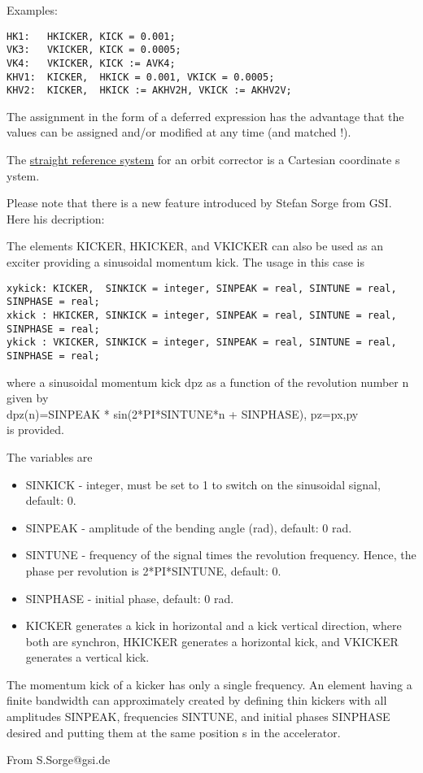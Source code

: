  Examples: 
\begin{verbatim}
HK1:   HKICKER, KICK = 0.001;
VK3:   VKICKER, KICK = 0.0005;
VK4:   VKICKER, KICK := AVK4;
KHV1:  KICKER,  HKICK = 0.001, VKICK = 0.0005;
KHV2:  KICKER,  HKICK := AKHV2H, VKICK := AKHV2V;
\end{verbatim} 

The assignment in the form of a deferred expression has the advantage
that the values can be assigned and/or modified at any time (and matched
!).  

The \href{local_system.html#straight}{straight reference system} for an
orbit corrector is a Cartesian coordinate s ystem.  

Please note that there is a new feature introduced by Stefan Sorge from
GSI. Here his decription:

The elements KICKER, HKICKER, and VKICKER can also be used as  an
exciter providing a sinusoidal momentum kick. The usage in this case is   

\begin{verbatim}
xykick: KICKER,  SINKICK = integer, SINPEAK = real, SINTUNE = real, SINPHASE = real;  
xkick : HKICKER, SINKICK = integer, SINPEAK = real, SINTUNE = real, SINPHASE = real;  
ykick : VKICKER, SINKICK = integer, SINPEAK = real, SINTUNE = real, SINPHASE = real;  
\end{verbatim}
where a sinusoidal momentum kick dpz as a function of the  revolution
number n given by\\   
dpz(n)=SINPEAK * sin(2*PI*SINTUNE*n + SINPHASE), pz=px,py \\ 
is provided. 

The variables are 

\begin{itemize}
   \item SINKICK - integer, must be set to 1 to switch on the sinusoidal
     signal, default: 0.  
   \item SINPEAK - amplitude of the bending angle (rad), default: 0 rad.  
   \item SINTUNE - frequency of the signal times the revolution
     frequency.  Hence, the phase per revolution is 2*PI*SINTUNE,
     default: 0.   
   \item SINPHASE - initial phase, default: 0 rad.  
   \item KICKER generates a kick in horizontal and a kick vertical
     direction,  where both are synchron, HKICKER generates a horizontal
     kick,  and VKICKER generates a vertical kick.   
\end{itemize}

The momentum kick of a kicker has only a single frequency. An element
having a finite bandwidth can approximately created by defining  thin
kickers with all amplitudes SINPEAK, frequencies SINTUNE, and  initial
phases SINPHASE desired and putting them at the same position s in  the
accelerator.   

From S.Sorge@gsi.de  

